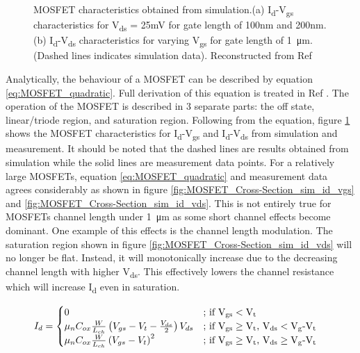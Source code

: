 \documentclass[11pt,a4paper]{report}
\begin{document}
\begin{figure}
\begin{minipage}{.5\linewidth}
\end{minipage}\par\medskip
\caption{MOSFET characteristics obtained from simulation.(a) I\textsubscript{d}-V\textsubscript{gs} characteristics for V\textsubscript{ds} = 25mV for gate length of 100nm and 200nm.(b) I\textsubscript{d}-V\textsubscript{ds} characteristics for varying V\textsubscript{gs} for gate length of \SI{1}{\micro\metre}.(Dashed lines indicates simulation data). Reconstructed from Ref \cite{Semiconductor_explained_more}}
\label{fig:MOSFET_Cross-Section_sim}
\end{figure}

Analytically, the behaviour of a MOSFET can be described by equation \ref{eq:MOSFET_quadratic}. Full derivation of this equation is treated in Ref \cite{Semiconductor_explained_more}. The operation of the MOSFET is described in 3 separate parts: the off state, linear/triode region, and saturation region. Following from the equation, figure \ref{fig:MOSFET_Cross-Section_sim} shows the MOSFET characteristics for I\textsubscript{d}-V\textsubscript{gs} and I\textsubscript{d}-V\textsubscript{ds} from simulation and measurement. It should be noted that the dashed lines are results obtained from simulation while the solid lines are measurement data points. For a relatively large MOSFETs, equation \ref{eq:MOSFET_quadratic} and measurement data agrees considerably as shown in figure \ref{fig:MOSFET_Cross-Section_sim_id_vgs} and \ref{fig:MOSFET_Cross-Section_sim_id_vds}. This is not entirely true for MOSFETs channel length under \SI{1}{\micro\metre} as some short channel effects become dominant. One example of this effects is the channel length modulation. The saturation region shown in figure \ref{fig:MOSFET_Cross-Section_sim_id_vds} will no longer be flat. Instead, it will monotonically increase due to the decreasing channel length with higher V\textsubscript{ds}. This effectively lowers the channel resistance which will increase I\textsubscript{d} even in saturation.

\begin{align}
     I_{d} &=
  \begin{cases}
   0        & \text{; if V\textsubscript{gs}} < \text{V\textsubscript{t}} \\
   \mu_n C_{ox}\frac{W}{L_{ch}}\left(V_{gs} - V_t - \frac{V_{ds}}{2}\right)V_{ds} & \text{; if V\textsubscript{gs}} \geq  \text{V\textsubscript{t}, V\textsubscript{ds}} <  \text{V\textsubscript{g}-V\textsubscript{t}} \\ 
   \mu_n C_{ox}\frac{W}{L_{ch}}\left(V_{gs} - V_t\right)^2 & \text{; if V\textsubscript{gs}} \geq  \text{V\textsubscript{t}, V\textsubscript{ds}} \geq \text{V\textsubscript{g}-V\textsubscript{t}}
  \end{cases}
  \label{eq:MOSFET_quadratic}
\end{align}
\end{document}
